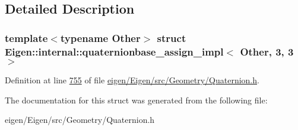 \subsection{Detailed Description}
\subsubsection*{template$<$typename Other$>$\newline
struct Eigen\+::internal\+::quaternionbase\+\_\+assign\+\_\+impl$<$ Other, 3, 3 $>$}



Definition at line \hyperlink{eigen_2_eigen_2src_2_geometry_2_quaternion_8h_source_l00755}{755} of file \hyperlink{eigen_2_eigen_2src_2_geometry_2_quaternion_8h_source}{eigen/\+Eigen/src/\+Geometry/\+Quaternion.\+h}.



The documentation for this struct was generated from the following file\+:\begin{DoxyCompactItemize}
\item 
eigen/\+Eigen/src/\+Geometry/\+Quaternion.\+h\end{DoxyCompactItemize}

